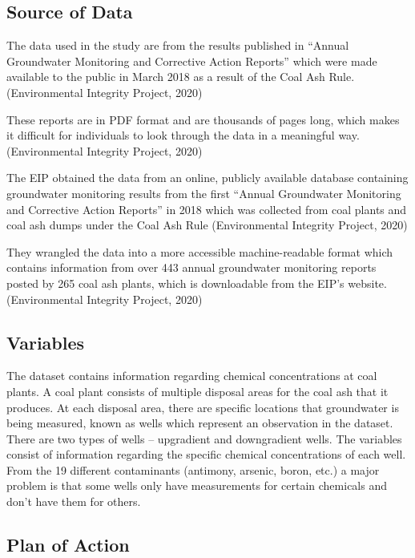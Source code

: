 \documentclass[12pt, twoside]{amherstthesis}
\begin{document}
\hypertarget{source-of-data}{%
\subsection{Source of Data}\label{source-of-data}}

The data used in the study are from the results published in ``Annual Groundwater Monitoring and Corrective Action Reports'' which were made available to the public in March 2018 as a result of the Coal Ash Rule. (Environmental Integrity Project, 2020)

These reports are in PDF format and are thousands of pages long, which makes it difficult for individuals to look through the data in a meaningful way. (Environmental Integrity Project, 2020)

The EIP obtained the data from an online, publicly available database containing groundwater monitoring results from the first ``Annual Groundwater Monitoring and Corrective Action Reports'' in 2018 which was collected from coal plants and coal ash dumps under the Coal Ash Rule (Environmental Integrity Project, 2020)

They wrangled the data into a more accessible machine-readable format which contains information from over 443 annual groundwater monitoring reports posted by 265 coal ash plants, which is downloadable from the EIP's website. (Environmental Integrity Project, 2020)

\newpage

\hypertarget{variables}{%
\subsection{Variables}\label{variables}}

The dataset contains information regarding chemical concentrations at coal plants. A coal plant consists of multiple disposal areas for the coal ash that it produces. At each disposal area, there are specific locations that groundwater is being measured, known as wells which represent an observation in the dataset. There are two types of wells -- upgradient and downgradient wells. The variables consist of information regarding the specific chemical concentrations of each well. From the 19 different contaminants (antimony, arsenic, boron, etc.) a major problem is that some wells only have measurements for certain chemicals and don't have them for others.

\hypertarget{plan-of-action}{%
\subsection{Plan of Action}\label{plan-of-action}}
\end{document}
